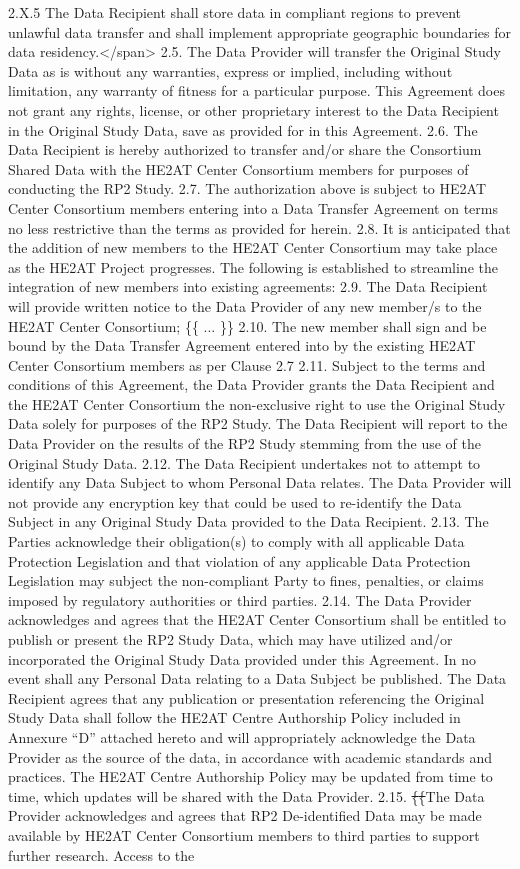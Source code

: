 \documentclass[12pt,letterpaper]{article}
\newcommand{\deleted}[1]{\textcolor{deletecolor}{\sout{#1}}}
\begin{document}
2.X.5 The Data Recipient shall store data in compliant regions to prevent unlawful data transfer and shall implement appropriate geographic boundaries for data residency.</span> 2.5.	The Data Provider will transfer the Original Study Data as is without any warranties, express or implied, including without limitation, any warranty of fitness for a particular purpose. This Agreement does not grant any rights, license, or other proprietary interest to the Data Recipient in the Original Study Data, save as provided for in this Agreement. 2.6.	The Data Recipient is hereby authorized to transfer and/or share the Consortium Shared Data with the HE2AT Center Consortium members for purposes of conducting the RP2 Study. 2.7.	The authorization above is subject to HE2AT Center Consortium members entering into a Data Transfer Agreement on terms no less restrictive than the terms as provided for herein. 2.8.	It is anticipated that the addition of new members to the HE2AT Center Consortium may take place as the HE2AT Project progresses. The following is established to streamline the integration of new members into existing agreements: 2.9.	The Data Recipient will provide written notice to the Data Provider of any new member/s to the HE2AT Center Consortium; \{\{ ... \}\} 2.10.	The new member shall sign and be bound by the Data Transfer Agreement entered into by the existing HE2AT Center Consortium members as per Clause 2.7 2.11.	Subject to the terms and conditions of this Agreement, the Data Provider grants the Data Recipient and the HE2AT Center Consortium the non-exclusive right to use the Original Study Data solely for purposes of the RP2 Study. The Data Recipient will report to the Data Provider on the results of the RP2 Study stemming from the use of the Original Study Data. 2.12.	The Data Recipient undertakes not to attempt to identify any Data Subject to whom Personal Data relates. The Data Provider will not provide any encryption key that could be used to re-identify the Data Subject in any Original Study Data provided to the Data Recipient. 2.13.	The Parties acknowledge their obligation(s) to comply with all applicable Data Protection Legislation and that violation of any applicable Data Protection Legislation may subject the non-compliant Party to fines, penalties, or claims imposed by regulatory authorities or third parties. 2.14.	The Data Provider acknowledges and agrees that the HE2AT Center Consortium shall be entitled to publish or present the RP2 Study Data, which may have utilized and/or incorporated the Original Study Data provided under this Agreement. In no event shall any Personal Data relating to a Data Subject be published. The Data Recipient agrees that any publication or presentation referencing the Original Study Data shall follow the HE2AT Centre Authorship Policy included in Annexure “D” attached hereto and will appropriately acknowledge the Data Provider as the source of the data, in accordance with academic standards and practices. The HE2AT Centre Authorship Policy may be updated from time to time, which updates will be shared with the Data Provider. 2.15. \deleted\{\deleted\{The Data Provider acknowledges and agrees that RP2 De-identified Data may be made available by HE2AT Center Consortium members to third parties to support further research. Access to the 
\end{document}

